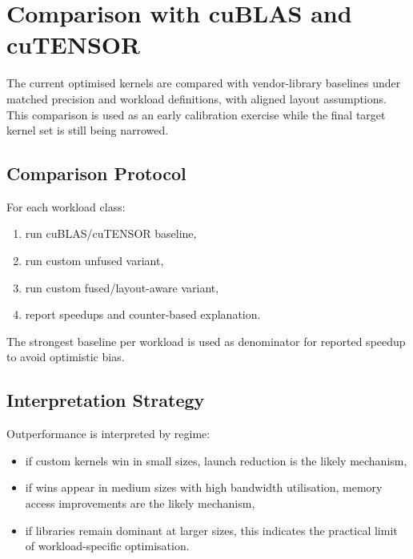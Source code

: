 \section{Comparison with cuBLAS and cuTENSOR}\label{sec:comparison}

The current optimised kernels are compared with vendor-library baselines under
matched precision and workload definitions, with aligned layout assumptions.
This comparison is used as an early calibration exercise while the final target
kernel set is still being narrowed.

\subsection{Comparison Protocol}

For each workload class:

\begin{enumerate}
  \item run cuBLAS/cuTENSOR baseline,
  \item run custom unfused variant,
  \item run custom fused/layout-aware variant,
  \item report speedups and counter-based explanation.
\end{enumerate}

The strongest baseline per workload is used as denominator for reported speedup
to avoid optimistic bias.

\subsection{Interpretation Strategy}

Outperformance is interpreted by regime:

\begin{itemize}
  \item if custom kernels win in small sizes, launch reduction is the likely
    mechanism,
  \item if wins appear in medium sizes with high bandwidth utilisation, memory
    access improvements are the likely mechanism,
  \item if libraries remain dominant at larger sizes, this indicates the
    practical limit of workload-specific optimisation.
\end{itemize}
